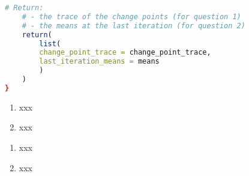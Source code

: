 \documentclass{article}
\begin{document}
\begin{enumerate}
\begin{lstlisting}[language=R]
    # Return:
    # - the trace of the change points (for question 1) 
    # - the means at the last iteration (for question 2)
    return(
        list(
        change_point_trace = change_point_trace, 
        last_iteration_means = means 
        )
    )
}
\end{lstlisting}



\end{enumerate}



\begin{enumerate}
\item xxx
\item xxx
\end{enumerate}

\begin{enumerate}
\item xxx
\item xxx
\end{enumerate}
 
\end{document}
